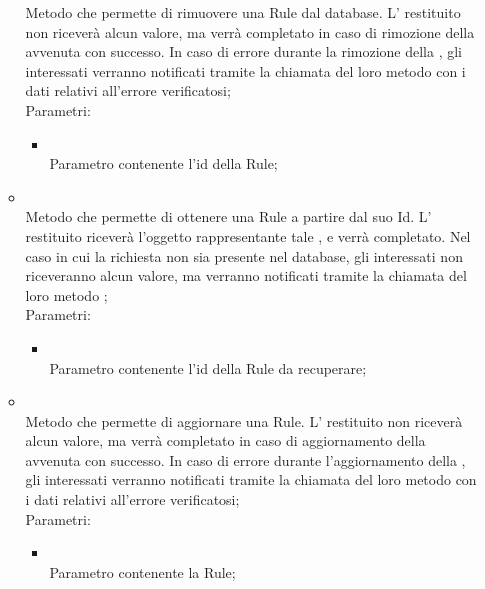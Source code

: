 \begin{itemize}
\begin{itemize}
		Metodo che permette di rimuovere una Rule dal database. L' restituito non riceverà alcun valore, ma verrà completato in caso di rimozione della  avvenuta con successo. In caso di errore durante la rimozione della , gli  interessati verranno notificati tramite la chiamata del loro metodo  con i dati relativi all'errore verificatosi;\\
		Parametri:
		\begin{itemize}
			\item {} \\
			Parametro contenente l'id della Rule;
		\end{itemize}
		\item[]  \\
		Metodo che permette di ottenere una Rule a partire dal suo Id. L' restituito riceverà l'oggetto rappresentante tale , e verrà completato. Nel caso in cui la  richiesta non sia presente nel database, gli  interessati non riceveranno alcun valore, ma verranno notificati tramite la chiamata del loro metodo ;\\
		Parametri:
		\begin{itemize}
			\item {} \\
			Parametro contenente l'id della Rule da recuperare;
		\end{itemize}
		\item[]  \\
		Metodo che permette di aggiornare una Rule.  L' restituito non riceverà alcun valore, ma verrà completato in caso di aggiornamento della  avvenuta con successo. In caso di errore durante l'aggiornamento della , gli  interessati verranno notificati tramite la chiamata del loro metodo  con i dati relativi all'errore verificatosi;\\
		Parametri:
		\begin{itemize}
			\item {} \\
			Parametro contenente la Rule;
		\end{itemize}
	\end{itemize}
\end{itemize}

